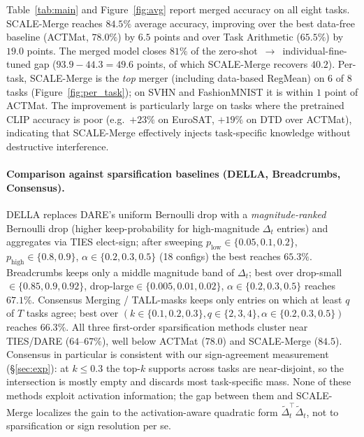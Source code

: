 \documentclass{article} %
\begin{document}
Table~\ref{tab:main} and Figure~\ref{fig:avg} report merged accuracy on all eight tasks. SCALE-Merge reaches $\mathbf{84.5\%}$ average accuracy, improving over the best data-free baseline (ACTMat, $78.0\%$) by $6.5$ points and over Task Arithmetic ($65.5\%$) by $19.0$ points. The merged model closes $81\%$ of the zero-shot~$\to$~individual-fine-tuned gap ($93.9 - 44.3 = 49.6$ points, of which SCALE-Merge recovers $40.2$). Per-task, SCALE-Merge is the \emph{top} merger (including data-based RegMean) on 6 of 8 tasks (Figure~\ref{fig:per_task}); on SVHN and FashionMNIST it is within $1$ point of ACTMat. The improvement is particularly large on tasks where the pretrained CLIP accuracy is poor (e.g.\ $+23\%$ on EuroSAT, $+19\%$ on DTD over ACTMat), indicating that SCALE-Merge effectively injects task-specific knowledge without destructive interference.

\paragraph{Comparison against sparsification baselines (DELLA, Breadcrumbs, Consensus).} DELLA \citep{deep2024della} replaces DARE's uniform Bernoulli drop with a \emph{magnitude-ranked} Bernoulli drop (higher keep-probability for high-magnitude $\Delta_t$ entries) and aggregates via TIES elect-sign; after sweeping $p_\text{low}{\in}\{0.05,0.1,0.2\}$, $p_\text{high}{\in}\{0.8,0.9\}$, $\alpha{\in}\{0.2,0.3,0.5\}$ (18 configs) the best reaches $\mathbf{65.3\%}$. Breadcrumbs \citep{davari2024model} keeps only a middle magnitude band of $\Delta_t$; best over drop-small${\in}\{0.85,0.9,0.92\}$, drop-large${\in}\{0.005,0.01,0.02\}$, $\alpha{\in}\{0.2,0.3,0.5\}$ reaches $\mathbf{67.1\%}$. Consensus Merging / TALL-masks \citep{wang2024localizing} keeps only entries on which at least $q$ of $T$ tasks agree; best over $(k{\in}\{0.1,0.2,0.3\}, q{\in}\{2,3,4\}, \alpha{\in}\{0.2,0.3,0.5\})$ reaches $\mathbf{66.3\%}$. All three first-order sparsification methods cluster near TIES/DARE ($64$--$67\%$), well below ACTMat ($78.0$) and SCALE-Merge ($84.5$). Consensus in particular is consistent with our sign-agreement measurement (\S\ref{sec:exp}): at $k{\leq}0.3$ the top-$k$ supports across tasks are near-disjoint, so the intersection is mostly empty and discards most task-specific mass. None of these methods exploit activation information; the gap between them and SCALE-Merge localizes the gain to the activation-aware quadratic form $\tilde\Delta_t^\top\tilde\Delta_t$, not to sparsification or sign resolution per se.
\end{document}
